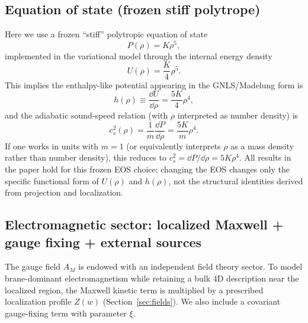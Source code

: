 \documentclass[11pt]{article}
\begin{document}
\subsection{Equation of state (frozen stiff polytrope)}
\label{sec:eos}

Here we use a frozen ``stiff'' polytropic equation of state
\begin{equation}
P(\rho)=K\rho^5,
\end{equation}
implemented in the variational model through the internal energy density
\begin{equation}
U(\rho)=\frac{K}{4}\rho^5.
\label{eq:Uofrho}
\end{equation}
This implies the enthalpy-like potential appearing in the GNLS/Madelung form is
\begin{equation}
h(\rho)\equiv \frac{\dd U}{\dd \rho}=\frac{5K}{4}\rho^4,
\end{equation}
and the adiabatic sound-speed relation (with $\rho$ interpreted as number density) is
\begin{equation}
c_s^2(\rho)=\frac{1}{m}\frac{\dd P}{\dd \rho}=\frac{5K}{m}\rho^4.
\end{equation}
If one works in units with $m=1$ (or equivalently interprets $\rho$ as a mass density rather than number density), this reduces to $c_s^2=\dd P/\dd\rho=5K\rho^4$.
All results in the paper hold for this frozen EOS choice; changing the EOS changes only the specific functional form of $U(\rho)$ and $h(\rho)$, not the structural identities derived from projection and localization.

\subsection{Electromagnetic sector: localized Maxwell + gauge fixing + external sources}
\label{sec:action-em}

The gauge field $A_M$ is endowed with an independent field theory sector. To model brane-dominant electromagnetism while retaining a bulk 4D description near the localized region, the Maxwell kinetic term is multiplied by a prescribed localization profile $Z(w)$ (Section~\ref{sec:fields}). We also include a covariant gauge-fixing term with parameter $\xi$.
\end{document}
